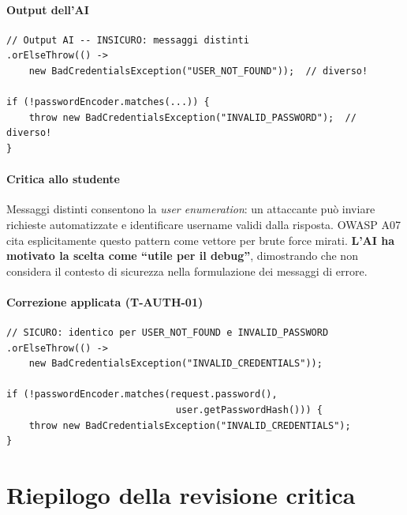 ﻿\documentclass[a4paper,12pt]{report}
\begin{document}
\paragraph{Output dell'AI}
\begin{lstlisting}[style=java]
// Output AI -- INSICURO: messaggi distinti
.orElseThrow(() ->
    new BadCredentialsException("USER_NOT_FOUND"));  // diverso!

if (!passwordEncoder.matches(...)) {
    throw new BadCredentialsException("INVALID_PASSWORD");  // diverso!
}
\end{lstlisting}

\paragraph{Critica allo studente}
Messaggi distinti consentono la \emph{user enumeration}: un attaccante può
inviare richieste automatizzate e identificare username validi dalla risposta.
OWASP A07 cita esplicitamente questo pattern come vettore per brute force mirati.
\textbf{L'AI ha motivato la scelta come ``utile per il debug''}, dimostrando
che non considera il contesto di sicurezza nella formulazione dei messaggi di errore.

\paragraph{Correzione applicata (T-AUTH-01)}

\begin{securebox}[title={Messaggio uniforme --- nessuna information disclosure (T-AUTH-01)}]
\begin{lstlisting}[style=java]
// SICURO: identico per USER_NOT_FOUND e INVALID_PASSWORD
.orElseThrow(() ->
    new BadCredentialsException("INVALID_CREDENTIALS"));

if (!passwordEncoder.matches(request.password(),
                              user.getPasswordHash())) {
    throw new BadCredentialsException("INVALID_CREDENTIALS");
}
\end{lstlisting}
\end{securebox}

\section{Riepilogo della revisione critica}
\end{document}
